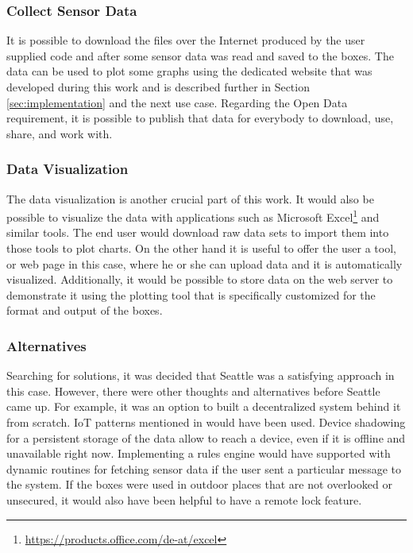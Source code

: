 \documentclass{article}      %
\begin{document}
\subsubsection{Collect Sensor Data}

It is possible to download the files over the Internet produced by the user supplied code and after some sensor data was read and saved to the boxes. The data can be used to plot some graphs using the dedicated website that was developed during this work and is described further in Section \ref{sec:implementation} and the next use case. Regarding the Open Data requirement, it is possible to publish that data for everybody to download, use, share, and work with.

\subsubsection{Data Visualization} \label{sec:contrEnd}

  The data visualization is another crucial part of this work. It would also be possible to visualize the data with applications such as Microsoft Excel\footnote{\url{https://products.office.com/de-at/excel}} and similar tools. The end user would download raw data sets to import them into those tools to plot charts. On the other hand it is useful to offer the user a tool, or web page in this case, where he or she can upload data and it is automatically visualized. Additionally, it would be possible to store data on the web server to demonstrate it using the plotting tool that is specifically customized for the format and output of the boxes. 

\subsubsection{Alternatives}

Searching for solutions, it was decided that Seattle was a satisfying approach in this case. However, there were other thoughts and alternatives before Seattle came up. For example, it was an option to built a decentralized system behind it from scratch. \gls{IoT} patterns mentioned in \cite{iotPatterns} would have been used. Device shadowing for a persistent storage of the data allow to reach a device, even if it is offline and unavailable right now. Implementing a rules engine would have supported with dynamic routines for fetching sensor data if the user sent a particular message to the system. If the boxes were used in outdoor places that are not overlooked or unsecured, it would also have been helpful to have a remote lock feature.
\end{document}
